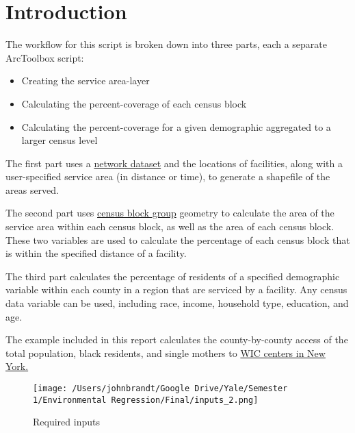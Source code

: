 \documentclass[11pt,]{article}
\providecommand{\tightlist}{%
\setlength{\itemsep}{0pt}\setlength{\parskip}{0pt}}
\begin{document}
\vskip 6.5pt


\noindent  \section{Introduction}\label{introduction}

The workflow for this script is broken down into three parts, each a
separate ArcToolbox script:

\begin{itemize}
\tightlist
\item
  Creating the service area-layer
\item
  Calculating the percent-coverage of each census block
\item
  Calculating the percent-coverage for a given demographic aggregated to
  a larger census level
\end{itemize}

\noindent The first part uses a
\href{https://www.arcgis.com/home/item.html?id=0f4ae38e76b241609057286f6b34f597}{network
dataset} and the locations of facilities, along with a user-specified
service area (in distance or time), to generate a shapefile of the areas
served. \vspace{3mm}

\noindent The second part uses
\href{https://www.census.gov/geo/maps-data/data/tiger-data.html}{census
block group} geometry to calculate the area of the service area within
each census block, as well as the area of each census block. These two
variables are used to calculate the percentage of each census block that
is within the specified distance of a facility. \vspace{3mm}

\noindent The third part calculates the percentage of residents of a
specified demographic variable within each county in a region that are
serviced by a facility. Any census data variable can be used, including
race, income, household type, education, and age. \vspace{3mm}

\noindent The example included in this report calculates the
county-by-county access of the total population, black residents, and
single mothers to \href{http://www.nyskwic.org/map/kwicmap.cfm}{WIC
centers in New York.}

\begin{figure}[htbp]
\centering
\texttt{[image: /Users/johnbrandt/Google Drive/Yale/Semester 1/Environmental Regression/Final/inputs\_2.png]}
\caption{Required inputs}
\end{figure}
\end{document}
